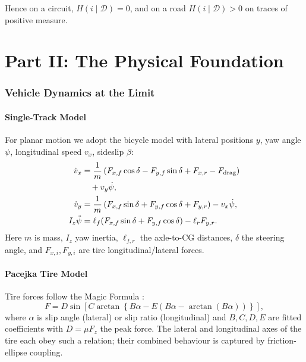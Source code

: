 \documentclass[11pt,twocolumn]{article}
\theoremstyle{definition}
\theoremstyle{remark}
\begin{document}
Hence on a circuit, $H(i \mid \mathcal{D}) = 0$, and on a road $H(i \mid \mathcal{D}) > 0$ on traces of positive measure.

\bigskip

\part*{Part II: The Physical Foundation}

\section{Vehicle Dynamics at the Limit}
\label{sec:vehicle-dynamics}

\subsection{Single-Track Model}

For planar motion we adopt the bicycle model \cite{rajamani2011vehicle,jazar2017vehicle,gillespie1992fundamentals} with lateral positions $y$, yaw angle $\psi$, longitudinal speed $v_x$, sideslip $\beta$:
\begin{align}
\dot{v}_x &= \frac{1}{m}\left(F_{x,f}\cos\delta - F_{y,f}\sin\delta + F_{x,r} - F_{\mathrm{drag}}\right) \notag\\
&\quad + v_y \dot\psi,\\
\dot{v}_y &= \frac{1}{m}\left(F_{x,f}\sin\delta + F_{y,f}\cos\delta + F_{y,r}\right) - v_x \dot\psi,\\
I_z \ddot{\psi} &= \ell_f (F_{x,f}\sin\delta + F_{y,f}\cos\delta) - \ell_r F_{y,r}.
\end{align}
Here $m$ is mass, $I_z$ yaw inertia, $\ell_{f,r}$ the axle-to-CG distances, $\delta$ the steering angle, and $F_{x,i}, F_{y,i}$ are tire longitudinal/lateral forces.

\subsection{Pacejka Tire Model}

Tire forces follow the Magic Formula \cite{pacejka2012tyre}:
\begin{equation}
F = D \sin\left[C \arctan\left\{B\alpha - E\left(B\alpha - \arctan(B\alpha)\right)\right\}\right],
\end{equation}
where $\alpha$ is slip angle (lateral) or slip ratio (longitudinal) and $B,C,D,E$ are fitted coefficients with $D = \mu F_z$ the peak force. The lateral and longitudinal axes of the tire each obey such a relation; their combined behaviour is captured by friction-ellipse coupling.
\end{document}
